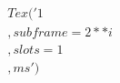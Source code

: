 \documentclass[preview]{standalone}
\begin{document}
\begin{align*}
Tex('1\\,subframe = {2 ** i}\\,slots = 1\\,ms')
\end{align*}
\end{document}
